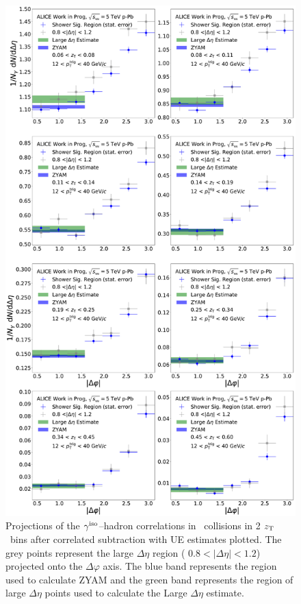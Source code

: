 \begin{figure}[h]
	\center
	\includegraphics[width=.99\textwidth]{G-H_New/UE_Plot_p-Pb_Single.pdf}
\caption{Projections of the $\gamma^\mathrm{iso}$--hadron correlations in \pPb~collisions in 2 $z_{\mathrm{T}}$~bins after correlated subtraction with UE estimates plotted. The grey points represent the large $\Delta\eta$ region ( $ 0.8 < |\Delta\eta| < 1.2$) projected onto the $\Delta\varphi$ axis. The blue band represents the region used to calculate ZYAM and the green band represents the region of large $\Delta\eta$ points used to calculate the Large $\Delta\eta$ estimate.}
\label{small_uncorr}
\end{figure}


